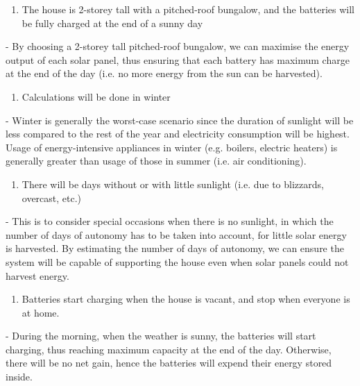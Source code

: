 \begin{enumerate}
    \item The house is 2-storey tall with a pitched-roof bungalow, and the batteries will be fully charged at the end of a sunny day
\end{enumerate}
- By choosing a 2-storey tall pitched-roof bungalow, we can maximise the energy output of each solar panel, thus ensuring that each battery has maximum charge at the end of the day (i.e. no more energy from the sun can be harvested). 
\begin{enumerate}[resume]
    \item Calculations will be done in winter
\end{enumerate}
- Winter is generally the worst-case scenario since the duration of sunlight will be less compared to the rest of the year and electricity consumption will be highest. Usage of energy-intensive appliances in winter (e.g. boilers, electric heaters) is generally greater than usage of those in summer (i.e. air conditioning).
\begin{enumerate}[resume]
    \item There will be days without or with little sunlight (i.e. due to blizzards, overcast, etc.)
\end{enumerate}
- This is to consider special occasions when there is no sunlight, in which the number of days of autonomy has to be taken into account, for little solar energy is harvested. By estimating the number of days of autonomy, we can ensure the system will be capable of supporting the house even when solar panels could not harvest energy.
\begin{enumerate}[resume]
    \item Batteries start charging when the house is vacant, and stop when everyone is at home.
\end{enumerate}
- During the morning, when the weather is sunny, the batteries will start charging, thus reaching maximum capacity at the end of the day. Otherwise, there will be no net gain, hence the batteries will expend their energy stored inside.